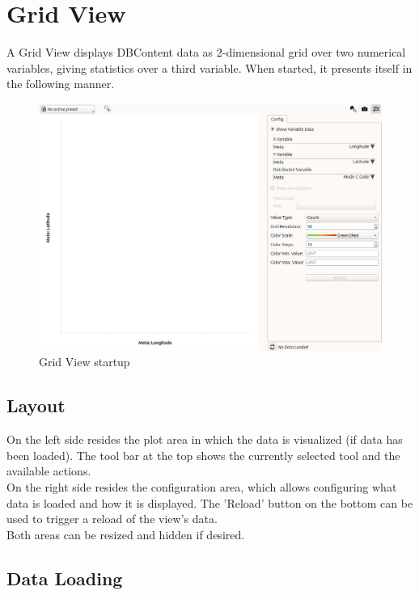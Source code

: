 \chapter{Grid View}
\label{sec:grid_view}

A Grid View displays DBContent data as 2-dimensional grid over two numerical variables, giving statistics over a third variable. When started, it presents itself in the following manner.

\begin{figure}[H]
    \hspace*{-2cm}
    \includegraphics[width=18cm,frame]{figures/grid_start.png}
  \caption{Grid View startup}
\end{figure}

\section{Layout}

On the left side resides the plot area in which the data is visualized (if data has been loaded). The tool bar at the top shows the currently selected tool and the available actions.\\

On the right side resides the configuration area, which allows configuring what data is loaded and how it is displayed. The 'Reload' button on the bottom can be used to trigger a reload of the view's data.\\

Both areas can be resized and hidden if desired.

\section{Data Loading}

